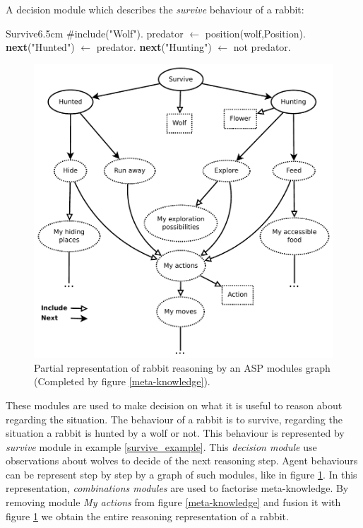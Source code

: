 \documentclass{aamas2012}
\begin{document}
	\begin{example}
		\label{survive_example}
		A decision module which describes the \emph{survive} behaviour of a rabbit:\newline
		\begin{module}{Survive}{6.5cm}
			\#include("Wolf").\newline
			predator $\leftarrow$ position(wolf,Position).\newline
			\textbf{next}("Hunted") $\leftarrow$ predator.\newline
			\textbf{next}("Hunting") $\leftarrow$ not predator.
		\end{module}
	\end{example}
	
	\begin{figure}
		\centering
		\includegraphics[keepaspectratio=true, scale=0.55]{modular_knowledge.pdf}
		\caption
		{
			\label{modular_knowledge}
			Partial representation of rabbit reasoning by an ASP modules graph
			(Completed by figure \ref{meta-knowledge}).
		}
	\end{figure}
	
	These modules are used to make decision on what it is useful to reason about regarding the situation.
	The behaviour of a rabbit is to survive, regarding the situation a rabbit is hunted by a wolf or not.
	This behaviour is represented by \emph{survive} module in example \ref{survive_example}.
	This \emph{decision module} use observations about wolves to decide of the next reasoning step.
	Agent behaviours can be represent step by step by a graph of such modules, like in figure \ref{modular_knowledge}.
	In this representation, \emph{combinations modules} are used to factorise meta-knowledge.
	By removing module \emph{My actions} from figure \ref{meta-knowledge} and fusion it with figure \ref{modular_knowledge} we
	obtain the entire reasoning representation of a rabbit.
	
\end{document}
